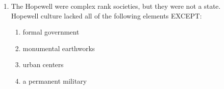 \documentclass[12pt]{article}
\begin{document}
\begin{enumerate}[label=\arabic*.]
\begin{enumerate}[label=(\alph*)]
    \item carbon-14 and uranium series dating
    \item tephrochronology and electron spin resonance dating
    \item dendrochronology and thermoluminescence dating
    \item isotope-ratio mass spectrometry and fission track dating
    \item lead-lead dating and uranium-thorium dating
\end{enumerate}
\item The Hopewell were complex rank societies, but they were not a state. Hopewell culture lacked all of the following elements EXCEPT:
\begin{enumerate}[label=(\alph*)]
    \item formal government
    \item monumental earthworks
    \item urban centers
    \item a permanent military
\end{enumerate}
\end{enumerate}
\end{document}
